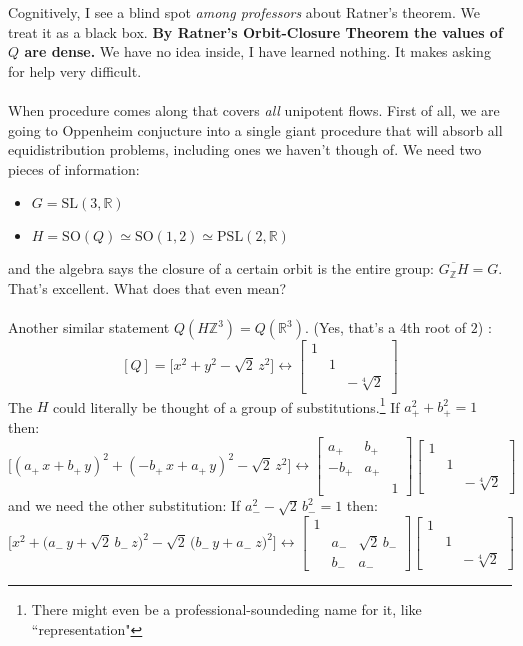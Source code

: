 \documentclass[12pt]{article}
\begin{document}
Cognitively, I see a blind spot \textit{among professors} about Ratner's theorem.  We treat it as a black box.  \textbf{By Ratner's Orbit-Closure Theorem the values of $Q$ are dense.} We have no idea inside, I have learned nothing. It makes asking for help very difficult. \\ \\
When procedure comes along that covers \textit{all} unipotent flows.  First of all, we are going to Oppenheim conjucture into a single giant procedure that will absorb all equidistribution problems, including ones we haven't though of.  We need two pieces of information:
\begin{itemize}
\item $G = \mathrm{SL}(3,\mathbb{R})$
\item $H = \mathrm{SO}(Q) \simeq \mathrm{SO}(1,2) \simeq \mathrm{PSL}(2, \mathbb{R})$
\end{itemize}
and the algebra says the closure of a certain orbit is the entire group: $\overline{G_\mathbb{Z}H}= G$.  That's excellent.  What does that even mean? \\ \\
Another similar statement $Q(H \mathbb{Z}^3) = Q(\mathbb{R}^3) $. (Yes, that's a 4th root of $2$) :
$$ [Q] = \big[ x^2 + y^2 - \sqrt{2} \, z^2  \big] \leftrightarrow \left[\begin{array}{ccc}1 & & \\ & 1 & \\ & & -\sqrt[4]{2} \end{array} \right] $$
The $H$ could literally be thought of a group of substitutions.\footnote{There might even be a professional-soundeding name for it, like ``representation"} If $a_+^2 + b_+^2 = 1$ then:
$$ \Big[ (a_+\, x + b_+ \, y)^2 + (-b_+\, x + a_+ \, y)^2 - \sqrt{2} \, z^2  \Big] \leftrightarrow 
\left[\begin{array}{rcc}a_+ & b_+ & \\ -b_+ & a_+ & \\ & & 1 \end{array} \right]
\left[\begin{array}{ccc}1 & & \\ & 1 & \\ & & -\sqrt[4]{2} \end{array} \right] $$
and we need the other substitution:
If $a_-^2 -  \sqrt{2}\, b_-^2 = 1$ then:
$$ \Big[ x^2 + \big( a_- \, y + \sqrt{2} \, b_-  \, z \big)^2 
- \sqrt{2} \, \big( b_-  \, y+ a_- \ z \big)^2  \Big] \leftrightarrow 
\left[\begin{array}{ccr}1 &  & \\ & a_- & \sqrt{2} \, b_-  \\ & b_- & a_- \end{array} \right]
\left[\begin{array}{ccc}1 & & \\ & 1 & \\ & & -\sqrt[4]{2} \end{array} \right] $$
\end{document}

